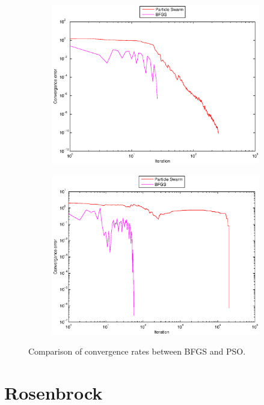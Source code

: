 \documentclass[12pt,parskip=full]{article}
\numberwithin{subsection}{section}
\begin{document}
\begin{figure}[!ht]
\begin{subfigure}[h]{0.45\textwidth}
				\includegraphics[width=\textwidth]{ParticleSwarmRose4DError.eps}
			\end{subfigure}
			\begin{subfigure}[h]{0.45\textwidth}
				\includegraphics[width=\textwidth]{ParticleSwarmRose8DError.eps}
			\end{subfigure}
			\caption{Comparison of convergence rates between BFGS and PSO.\label{fig:converg}}
		\end{figure}
		
	\section{Rosenbrock}
\end{document}
